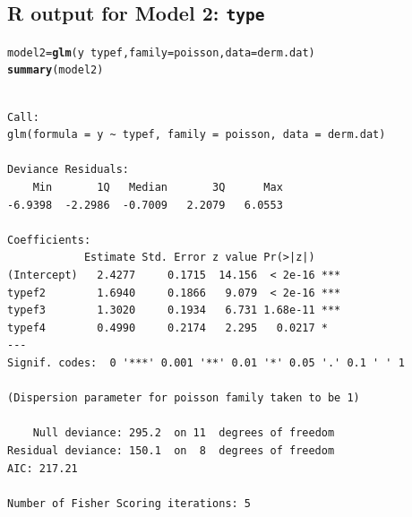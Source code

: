\documentclass{article}\usepackage[]{graphicx}\usepackage[svgnames]{xcolor}
\makeatletter
\newcommand{\hlopt}[1]{\textcolor[rgb]{0,0,0}{#1}}%
\newcommand{\hlstd}[1]{\textcolor[rgb]{0.345,0.345,0.345}{#1}}%
\newcommand{\hlkwb}[1]{\textcolor[rgb]{0.69,0.353,0.396}{#1}}%
\newcommand{\hlkwc}[1]{\textcolor[rgb]{0.333,0.667,0.333}{#1}}%
\newcommand{\hlkwd}[1]{\textcolor[rgb]{0.737,0.353,0.396}{\textbf{#1}}}%
\newenvironment{kframe}{%
 \def\at@end@of@kframe{}%
 \ifinner\ifhmode%
  \def\at@end@of@kframe{\end{minipage}}%
  \begin{minipage}{\columnwidth}%
 \fi\fi%
 \def\FrameCommand##1{\hskip\@totalleftmargin \hskip-\fboxsep
 \colorbox{shadecolor}{##1}\hskip-\fboxsep
     \hskip-\linewidth \hskip-\@totalleftmargin \hskip\columnwidth}%
 \MakeFramed {\advance\hsize-\width
   \@totalleftmargin\z@ \linewidth\hsize
   \@setminipage}}%
 {\par\unskip\endMakeFramed%
 \at@end@of@kframe}
\newenvironment{knitrout}{}{} %
\makeatother
\begin{document}
\subsection*{R output for Model 2: \texttt{type}}
\begin{knitrout}
\color{fgcolor}\begin{kframe}
\begin{alltt}
\hlstd{model2} \hlkwb{=} \hlkwd{glm}\hlstd{(y} \hlopt{~} \hlstd{typef,} \hlkwc{family} \hlstd{= poisson,} \hlkwc{data} \hlstd{= derm.dat)}
\hlkwd{summary}\hlstd{(model2)}
\end{alltt}
\begin{verbatim}

Call:
glm(formula = y ~ typef, family = poisson, data = derm.dat)

Deviance Residuals: 
    Min       1Q   Median       3Q      Max  
-6.9398  -2.2986  -0.7009   2.2079   6.0553  

Coefficients:
            Estimate Std. Error z value Pr(>|z|)    
(Intercept)   2.4277     0.1715  14.156  < 2e-16 ***
typef2        1.6940     0.1866   9.079  < 2e-16 ***
typef3        1.3020     0.1934   6.731 1.68e-11 ***
typef4        0.4990     0.2174   2.295   0.0217 *  
---
Signif. codes:  0 '***' 0.001 '**' 0.01 '*' 0.05 '.' 0.1 ' ' 1

(Dispersion parameter for poisson family taken to be 1)

    Null deviance: 295.2  on 11  degrees of freedom
Residual deviance: 150.1  on  8  degrees of freedom
AIC: 217.21

Number of Fisher Scoring iterations: 5
\end{verbatim}
\end{kframe}
\end{knitrout}
\end{document}
